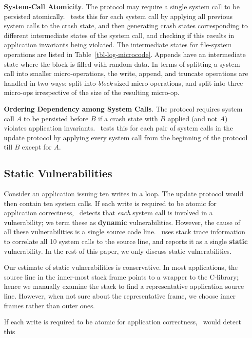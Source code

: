 \textbf{System-Call Atomicity}. The protocol may require a single system call
to be persisted atomically. \toolname\ tests this for each system call by
applying all previous system calls to the crash state, and then generating 
crash states corresponding to different intermediate states of the system
call, and checking if this results in application invariants being violated.
The intermediate states for file-system operations are listed in
Table~\ref{tbl-log-microcode}. Appends have an intermediate state where the
block is filled with random data. In terms of splitting a system call into
smaller micro-operations, the write, append, and truncate operations are
handled in two ways: split into \textit{block} sized micro-operations, and
split into three micro-ops irrespective of the size of the resulting micro-op.

\textbf{Ordering Dependency among System Calls}. The protocol requires system
call $A$ to be persisted before $B$ if a crash state with $B$ applied (and not
$A$) violates application invariants. \toolname\ tests this for each pair of
system calls in the update protocol by applying every system call from the
beginning of the protocol till $B$ except for $A$. 

\subsection{Static Vulnerabilities}
Consider an application issuing ten writes in a loop. The update protocol would
then contain ten  system calls. If each write is required to
be atomic for application correctness, \toolname\ detects that \textit{each}
system call is involved in a vulnerability; we term these as \textbf{dynamic}
vulnerabilities. However, the cause of all these vulnerabilities is a single
source code line. \toolname\ uses stack trace information to correlate all
10 system calls to the source line, and reports it as a single
\textbf{static} vulnerability. In the rest of this paper, we only discuss static
vulnerabilities.

Our estimate of static vulnerabilities is conservative.  In most applications,
the source line in the inner-most stack frame points to a wrapper to the
C-library; hence we manually examine the stack to find a representative
application source line. However, when not sure about the representative frame,
we choose inner frames rather than outer ones.

If each write is required
to be atomic for application correctness, \toolname\ would detect this 


